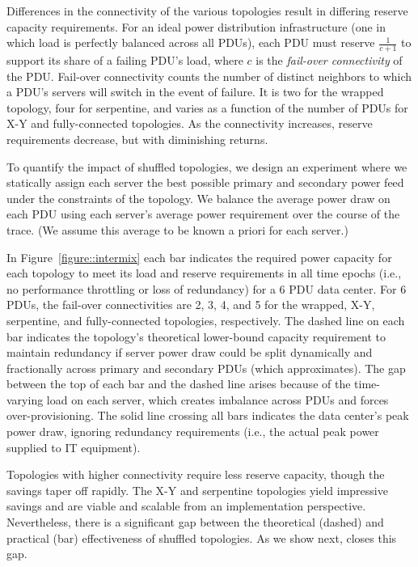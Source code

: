 Differences in the connectivity of the various topologies result in differing reserve capacity requirements.
For an ideal power distribution infrastructure (one in which load is perfectly balanced across all PDUs), each PDU must reserve $\frac{1}{c + 1}$ to support its share of a failing PDU's load, where $c$ is the \emph{fail-over connectivity} of the PDU.  Fail-over connectivity counts the number of distinct neighbors to which a PDU's servers will switch in the event of failure. It is two for the wrapped topology, four for serpentine, and varies as a function of the number of PDUs for X-Y and fully-connected topologies. As the connectivity increases, reserve requirements decrease, but with diminishing returns.

To quantify the impact of shuffled topologies, we design an experiment where we statically assign each server the best possible primary and secondary power feed under the constraints of the topology.  We balance the average power draw on each PDU using each server's average power requirement over the course of the trace. (We assume this average to be known a priori for each server.)  

In Figure~\ref{figure::intermix} each bar indicates the required power capacity for each topology to meet its load and reserve requirements in all time epochs  (i.e., no performance throttling or loss of redundancy) for a 6 PDU data center.  For 6 PDUs, the fail-over connectivities are 2, 3, 4, and 5 for the wrapped, X-Y, serpentine, and fully-connected topologies, respectively.  The dashed line on each bar indicates the topology's theoretical lower-bound capacity requirement to maintain redundancy if server power draw could be split dynamically and fractionally across primary and secondary PDUs (which \PowerRouting approximates).  The gap between the top of each bar and the dashed line arises because of the time-varying load on each server, which creates imbalance across PDUs and forces over-provisioning. The solid line crossing all bars indicates the data center's peak power draw, ignoring redundancy requirements (i.e., the actual peak power supplied to IT equipment).

Topologies with higher connectivity require less reserve capacity, though the savings taper off rapidly.  The X-Y and serpentine topologies yield impressive savings and are viable and scalable from an implementation perspective.  Nevertheless, there is a significant gap between the theoretical (dashed) and practical (bar) effectiveness of shuffled topologies.  As we show next, \PowerRouting closes this gap.   

